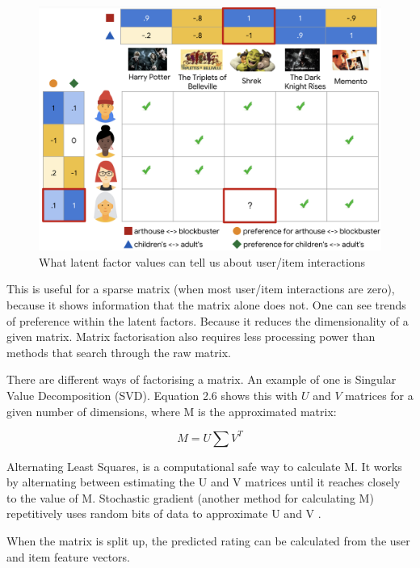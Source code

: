 \begin{figure}[H]
	\includegraphics[scale=0.45]{images/latent_factors}
	\centering
	\caption{What latent factor values can tell us about user/item interactions \citep{httpsdevelopersgooglecom_matrix_2023}} 
	\label{fig:figure}
\end{figure}

This is useful for a sparse matrix (when most user/item interactions are zero), because it shows information that the matrix alone does not.  One can see trends of preference within the latent factors. Because it reduces the dimensionality of a given matrix. Matrix factorisation also requires less processing power than methods that search through the raw matrix. 

There are different ways of factorising a matrix. An example of one is Singular Value Decomposition (SVD). Equation 2.6 shows this with $U$ and $V$ matrices for a given number of dimensions,  where M is the approximated matrix:

\begin{equation}
	M = U \sum V ^{T}
\end{equation}

Alternating Least Squares, is a computational safe way to calculate M. It works by alternating between estimating the U and V matrices until it reaches closely to the value of M. Stochastic gradient (another method for calculating M) repetitively uses random bits of data to approximate U and V \citep{koren_matrix_2009}. 

When the matrix is split up, the predicted rating can be calculated from the user and item feature vectors. 


